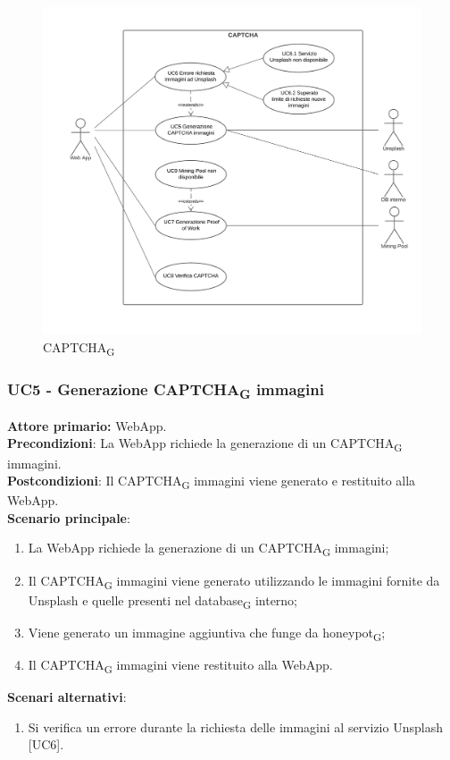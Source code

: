 \begin{figure}[H]
    \centering
    \includegraphics[scale=0.6]{img/captcha.png}
    \caption{CAPTCHA\textsubscript{G}}
\end{figure}


\subsubsection{UC5 - Generazione CAPTCHA\textsubscript{G} immagini}
\textbf{Attore primario:} WebApp.\\
\textbf{Precondizioni}: La WebApp richiede la generazione di un CAPTCHA\textsubscript{G} immagini.\\
\textbf{Postcondizioni}: Il CAPTCHA\textsubscript{G} immagini viene generato e restituito alla WebApp.\\

\textbf{Scenario principale}:
\begin{enumerate}
    \item La WebApp richiede la generazione di un CAPTCHA\textsubscript{G} immagini;
    \item Il CAPTCHA\textsubscript{G} immagini viene generato utilizzando le immagini fornite da Unsplash e quelle presenti nel database\textsubscript{G} interno;
    \item Viene generato un immagine aggiuntiva che funge da honeypot\textsubscript{G};
    \item Il CAPTCHA\textsubscript{G} immagini viene restituito alla WebApp.
\end{enumerate}
\textbf{Scenari alternativi}:
\begin{enumerate}
    \item Si verifica un errore durante la richiesta delle immagini al servizio Unsplash [UC6].
\end{enumerate}

